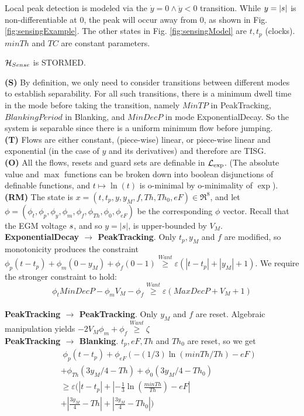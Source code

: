 Local peak detection is modeled via the $\dot{y} = 0 \wedge \ddot{y}<0$ transition.
While $y=|s|$ is non-differentiable at 0, the peak will occur away from 0, as shown in Fig. \ref{fig:sensingExample}.
The other states in Fig. \ref{fig:sensingModel} are $t, t_p$ (clocks).
$minTh$ and $TC$ are constant parameters.
\begin{thm}
	\label{thm:sensing}
	$\mathcal{H}_{Sense}$ is STORMED.	
\end{thm}
\begin{prf}
	\textbf{(S)} By definition, we only need to consider transitions between different modes to establish separability. 
	For all such transitions, there is a minimum dwell time in the mode before taking the transition, namely $MinTP$ in PeakTracking, $BlankingPeriod$ in Blanking, and  $MinDecP$ in mode ExponentialDecay.
	So the system is separable since there is a uniform minimum flow before jumping.
	\\
	\textbf{(T)} Flows are either constant, (piece-wise) linear, or piece-wise linear and exponential (in the case of $y$ and its derivatives) and therefore are TISG.
	\\
	\textbf{(O)} All the flows, resets and guard sets are definable in $\mathcal{L}_{\exp}$.
	(The absolute value and $\max$ functions can be broken down into boolean disjunctions of definable functions, and $t \mapsto \ln(t)$ is o-minimal by o-minimality of $\exp$).
	\\
	\textbf{(RM)} The state is $x = (t, t_p, y, y_M, f, Th, Th_0,eF) \in \Re^8$, and let 
	 $\phi = (\phi_t, \phi_{p}, \phi_y, \phi_m, \phi_f, \phi_{Th},\phi_0,\phi_{eF})$ be the corresponding $\phi$ vector.
	Recall that the \ac{EGM} voltage $s$, and so $y=|s|$, is upper-bounded by $V_M$.	
	\\ 
	\textbf{ExponentialDecay $\rightarrow$ PeakTracking}.
	Only $t_p,y_M$ and $f$ are modified, so monotonicity produces the constraint
	 $\phi_p(t-t_p) +\phi_m(0-y_M) + \phi_f(0-1) \stackrel{Want}{\geq} \varepsilon (|t-t_p|+|y_M|+1)$.
	We require the stronger constraint to hold:
	\[\phi_t MinDecP - \phi_m V_M -\phi_f \stackrel{Want}{\geq} \varepsilon(MaxDecP + V_M+1)\]
	\\
	\textbf{PeakTracking $\rightarrow$ PeakTracking}. Only $y_M$ and $f$ are reset. 
	Algebraic manipulation yields $-2V_M\phi_m + \phi_f \stackrel{Want}{\geq} \zeta$
	\\
	\textbf{PeakTracking $\rightarrow$ Blanking}.
	$t_p,eF,Th$ and $Th_0$ are reset, so we get
	\begin{eqnarray*}
	&&\;\phi_p(t-t_p) + \phi_{eF}(-(1/3)\ln(minTh/Th)-eF) 
	\\
	&&+\phi_{Th}(3y_M/4-Th) +\phi_0(3y_M/4-Th_0)
	\\
	&&\geq \varepsilon(|t-t_p|+ |-\frac{1}{3}\ln(\frac{minTh}{Th})-eF|
	\\
	&&+|\frac{3y_M}{4}-Th|+|\frac{3y_M}{4}-Th_0|)
	\end{eqnarray*}
	

\end{prf}
